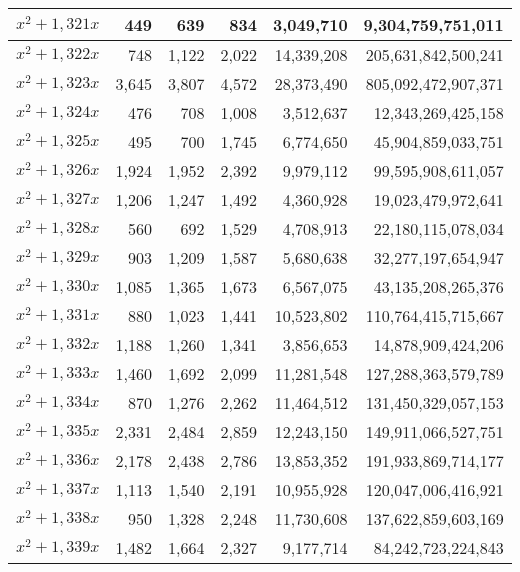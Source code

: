 \documentclass[a4paper]{amsproc}
\theoremstyle{plain}
\begin{document}
\begin{longtable}{ | l | r | r | r | r | r | }
$x^2 + 1{,}321x$ & 449 & 639 & 834 & 3{,}049{,}710 & 9{,}304{,}759{,}751{,}011 \\ \hline
$x^2 + 1{,}322x$ & 748 & 1{,}122 & 2{,}022 & 14{,}339{,}208 & 205{,}631{,}842{,}500{,}241 \\ \hline
$x^2 + 1{,}323x$ & 3{,}645 & 3{,}807 & 4{,}572 & 28{,}373{,}490 & 805{,}092{,}472{,}907{,}371 \\ \hline
$x^2 + 1{,}324x$ & 476 & 708 & 1{,}008 & 3{,}512{,}637 & 12{,}343{,}269{,}425{,}158 \\ \hline
$x^2 + 1{,}325x$ & 495 & 700 & 1{,}745 & 6{,}774{,}650 & 45{,}904{,}859{,}033{,}751 \\ \hline
$x^2 + 1{,}326x$ & 1{,}924 & 1{,}952 & 2{,}392 & 9{,}979{,}112 & 99{,}595{,}908{,}611{,}057 \\ \hline
$x^2 + 1{,}327x$ & 1{,}206 & 1{,}247 & 1{,}492 & 4{,}360{,}928 & 19{,}023{,}479{,}972{,}641 \\ \hline
$x^2 + 1{,}328x$ & 560 & 692 & 1{,}529 & 4{,}708{,}913 & 22{,}180{,}115{,}078{,}034 \\ \hline
$x^2 + 1{,}329x$ & 903 & 1{,}209 & 1{,}587 & 5{,}680{,}638 & 32{,}277{,}197{,}654{,}947 \\ \hline
$x^2 + 1{,}330x$ & 1{,}085 & 1{,}365 & 1{,}673 & 6{,}567{,}075 & 43{,}135{,}208{,}265{,}376 \\ \hline
$x^2 + 1{,}331x$ & 880 & 1{,}023 & 1{,}441 & 10{,}523{,}802 & 110{,}764{,}415{,}715{,}667 \\ \hline
$x^2 + 1{,}332x$ & 1{,}188 & 1{,}260 & 1{,}341 & 3{,}856{,}653 & 14{,}878{,}909{,}424{,}206 \\ \hline
$x^2 + 1{,}333x$ & 1{,}460 & 1{,}692 & 2{,}099 & 11{,}281{,}548 & 127{,}288{,}363{,}579{,}789 \\ \hline
$x^2 + 1{,}334x$ & 870 & 1{,}276 & 2{,}262 & 11{,}464{,}512 & 131{,}450{,}329{,}057{,}153 \\ \hline
$x^2 + 1{,}335x$ & 2{,}331 & 2{,}484 & 2{,}859 & 12{,}243{,}150 & 149{,}911{,}066{,}527{,}751 \\ \hline
$x^2 + 1{,}336x$ & 2{,}178 & 2{,}438 & 2{,}786 & 13{,}853{,}352 & 191{,}933{,}869{,}714{,}177 \\ \hline
$x^2 + 1{,}337x$ & 1{,}113 & 1{,}540 & 2{,}191 & 10{,}955{,}928 & 120{,}047{,}006{,}416{,}921 \\ \hline
$x^2 + 1{,}338x$ & 950 & 1{,}328 & 2{,}248 & 11{,}730{,}608 & 137{,}622{,}859{,}603{,}169 \\ \hline
$x^2 + 1{,}339x$ & 1{,}482 & 1{,}664 & 2{,}327 & 9{,}177{,}714 & 84{,}242{,}723{,}224{,}843 \\ \hline

\end{longtable}
\end{document}
